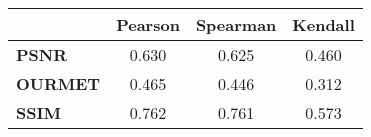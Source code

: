 \begin{tabular}{|l|c|c|c|}
\hline
&\textbf{Pearson}&\textbf{Spearman}&\textbf{Kendall}\\\hline
\textbf{PSNR}&0.630&0.625&0.460\\\hline
\textbf{OURMET}&0.465&0.446&0.312\\\hline
\textbf{SSIM}&0.762&0.761&0.573\\\hline
\end{tabular}
